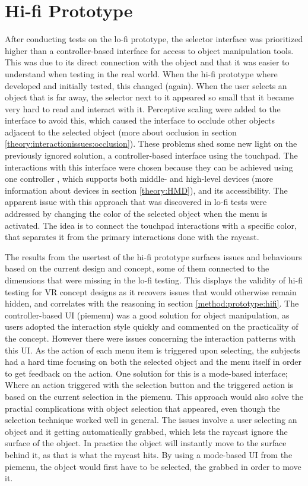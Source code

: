 \section{Hi-fi Prototype}
After conducting tests on the lo-fi prototype, the selector interface was prioritized higher than a controller-based interface for access to object manipulation tools. This was due to its direct connection with the object and that it was easier to understand when testing in the real world. When the hi-fi prototype where developed and initially tested, this changed (again). When the user selects an object that is far away, the selector next to it appeared so small that it became very hard to read and interact with it. Perceptive scaling were added to the interface to avoid this, which caused the interface to occlude other objects adjacent to the selected object (more about occlusion in section \ref{theory:interactionissues:occlusion}). These problems shed some new light on the previously ignored solution, a controller-based interface using the touchpad. The interactions with this interface were chosen because they can be achieved using one controller , which supports both middle- and high-level devices (more information about devices in section \ref{theory:HMD}), and its accessibility. The apparent issue with this approach that was discovered in lo-fi tests were addressed by changing the color of the selected object when the menu is activated. The idea is to connect the touchpad interactions with a specific color, that separates it from the primary interactions done with the raycast.

The results from the usertest of the hi-fi prototype surfaces issues and behaviours based on the current design and concept, some of them connected to the dimensions that were missing in the lo-fi testing. This displays the validity of hi-fi testing for VR concept designs as it recovers issues that would otherwise remain hidden, and correlates with the reasoning in section \ref{method:prototype:hifi}. The controller-based UI (piemenu) was a good solution for object manipulation, as users adopted the interaction style quickly and commented on the practicality of the concept. However there were issues concerning the interaction patterns with this UI. As the action of each menu item is triggered upon selecting, the subjects had a hard time focusing on both the selected object and the menu itself in order to get feedback on the action. One solution for this is a mode-based interface; Where an action triggered with the selection button and the triggered action is based on the current selection in the piemenu. This approach would also solve the practial complications with object selection that appeared, even though the selection technique worked well in general. The issues involve a user selecting an object and it getting automatically grabbed, which lets the raycast ignore the surface of the object. In practice the object will instantly move to the surface behind it, as that is what the raycast hits. By using a mode-based UI from the piemenu, the object would first have to be selected, the grabbed in order to move it.

